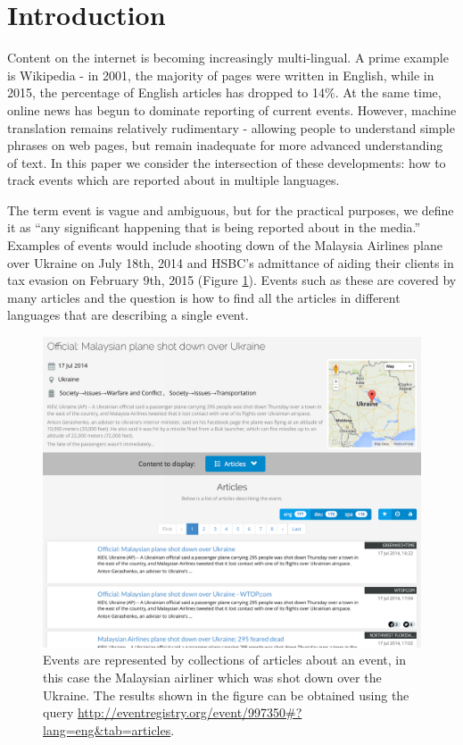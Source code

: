 \documentclass[twoside,11pt]{article}
\begin{document}
\section{Introduction}

Content on the internet is becoming increasingly multi-lingual. A prime example is Wikipedia - in 2001, the majority of pages were written in English, while in 2015, the percentage of English articles has dropped to 14\%. At the same time, online news has begun to dominate reporting of current events. However, machine translation remains relatively rudimentary - allowing people to understand simple phrases on web pages, but remain inadequate for more advanced understanding of text. In this paper we consider the intersection of these developments: how to track events which are reported about in multiple languages.

The term event is vague and ambiguous, but for the practical purposes, we define it as ``any significant happening that is being reported about in the media.'' Examples of events would include shooting down of the Malaysia Airlines plane over Ukraine on July 18th, 2014 and HSBC's admittance of aiding their clients in tax evasion on February 9th, 2015 (Figure \ref{fig:event2}). Events such as these are covered by many articles and the question is how to find all the articles in different languages that are describing a single event.

\begin{figure}
\centering
\includegraphics[width=1\textwidth]{events2.png}
\caption{\label{fig:event2} Events are represented by collections of articles about an event, in this case the Malaysian airliner which was shot down over the Ukraine. The results shown in the figure can be obtained using the query \url{http://eventregistry.org/event/997350\#?lang=eng\&tab=articles}.}
\end{figure}
\end{document}
